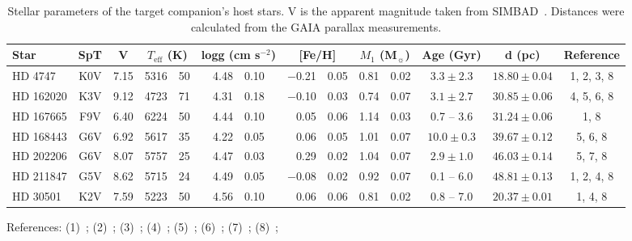 
\begin{table*}
        \small
        \centering
        \begin{threeparttable}[b]
   
        \caption{Stellar parameters of the target companion's host stars. V is the apparent magnitude taken from {SIMBAD}~\citep{wenger_simbad_2000}. {\rd{} Distances were calculated from the GAIA parallax measurements.}}
        \begin{tabular}{l c c r@{$~\pm~$}l r@{$~\pm~$}l r@{$~\pm~$}l r@{$~\pm~$}l c c c}
            \toprule
            Star & SpT & V &  \multicolumn{2}{c}{\(T_{\textrm{eff}}\) (K)} &  \multicolumn{2}{c}{logg (cm s\(^{-2} \))}  & \multicolumn{2}{c}{[Fe/H]} &  \multicolumn{2}{c}{\(M_1\) (M\(_{\sun} \))} & Age (Gyr) & d (pc) & Reference\\
            \midrule
            {HD 4747}     & K0V & 7.15 & 5316 & 50 & 4.48 & 0.10  & $-$0.21 & 0.05 & 0.81 & 0.02  & $3.3 \pm 2.3$   & $18.80 \pm 0.04$ & 1, 2, 3, 8 \\ 
            {HD 162020} & K3V & 9.12 & 4723 & 71 & 4.31 & 0.18  & $-$0.10 & 0.03 & 0.74 & 0.07  & $3.1 \pm 2.7$   & $30.85 \pm 0.06$ & 4, 5, 6, 8 \\  
            {HD 167665} & F9V & 6.40 & 6224 & 50 & 4.44 & 0.10  & 0.05       & 0.06 & 1.14 & 0.03  & 0.7 -- 3.6           & $ 31.24 \pm 0.06$ & 1, 8 \\
            {HD 168443} & G6V & 6.92 & 5617 & 35 & 4.22 & 0.05 & 0.06       & 0.05 & 1.01 & 0.07  & $10.0 \pm 0.3$  & $39.67 \pm 0.12$ & 5, 6, 8 \\ 
            {HD 202206} & G6V & 8.07 & 5757 & 25 & 4.47 & 0.03 & 0.29       & 0.02 & 1.04 & 0.07  & $2.9 \pm 1.0$    & $46.03 \pm 0.14$ & 5, 7, 8 \\ 
            {HD 211847} & G5V & 8.62 & 5715 & 24 & 4.49 & 0.05 & $-$0.08 & 0.02 & 0.92 & 0.07   & 0.1 -- 6.0            & $48.81 \pm 0.13 $ & 1, 2, 4, 8 \\ 
            {HD 30501}   & K2V & 7.59  & 5223 & 50 & 4.56 & 0.10 & 0.06       & 0.06 & 0.81 & 0.02  & 0.8 -- 7.0           & $20.37 \pm 0.01$ & 1, 4, 8 \\
            \bottomrule
        \end{tabular}
         \label{tab:starparams}
        \begin{tablenotes}
           \item[] References: (1)~\citet{sahlmann_search_2011}; (2)~\citet{santos_spectroscopic_2005}; (3)~\citet{crepp_trends_2016}; (4)~\citet{tsantaki_deriving_2013}; (5)~\cite{bonfanti_age_2016}; (6)~\citet{santos_spectroscopic_2004}; (7)~\citet{sousa_spectroscopic_2008}; {\rd(8)}~\citet{collaboration_gaia_2018};
         \end{tablenotes}
       \end{threeparttable}

\end{table*}